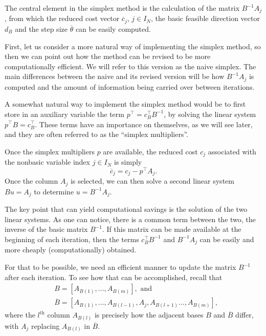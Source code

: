  
The central element in the simplex method is the calculation of the matrix $B^{-1}A_j$, from which the reduced cost vector $\overline{c}_j$, $j \in I_N$, the basic feasible direction vector $d_B$ and the step size $\overline{\theta}$ can be easily computed.

First, let us consider a more natural way of implementing the simplex method, so then we can point out how the method can be revised to be more computationally efficient. We will refer to this version as the naive simplex. The main differences between the naive and its revised version will be how $B^{-1}A_j$ is computed and the amount of information being carried over between iterations.

A somewhat natural way to implement the simplex method would be to first store in an auxiliary variable the term $p^\top = c_B^\top B^{-1}$, by solving the linear system $p^\top B = c_B^\top$. These terms have an importance on themselves, as we will see later, and they are often referred to as the ``simplex multipliers''.

Once the simplex multipliers $p$ are available, the reduced cost $c_j$ associated with the nonbasic variable index $j \in I_N$ is simply 
%
\begin{equation*}
	\overline{c}_j = c_j - p^\top A_j.	
\end{equation*}
%
Once the column $A_j$ is selected, we can then solve a second linear system $Bu = A_j$ to determine $u = B^{-1}A_j$. 

The key point that can yield computational savings is the solution of the two linear systems. As one can notice, there is a common term between the two, the inverse of the basic matrix $B^{-1}$. If this matrix can be made available at the beginning of each iteration, then the terms $c_B^\top B^{-1}$ and $B^{-1}A_j$ can be easily and more cheaply (computationally) obtained.

For that to be possible, we need an efficient manner to update the matrix $B^{-1}$ after each iteration. To see how that can be accomplished, recall that
%
\begin{align*}
	& B = [A_{B(1)}, \dots, A_{B(m)}], \text{ and } \\ 
	& \overline{B} = [A_{B(1)}, \dots, A_{B(l-1)},A_j,A_{B(l+1)}\dots, A_{B(m)}], 
\end{align*}
%
where the $l^{\text{th}}$ column $A_{B(l)}$ is precisely how the adjacent bases $B$ and $\overline{B}$ differ, with $A_j$ replacing $A_{B(l)}$ in $\overline{B}$.

